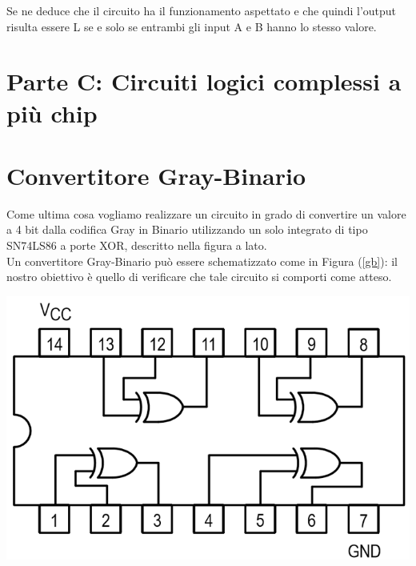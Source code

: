 \documentclass[10pt, a4paper, italian]{article}
\begin{document}
Se ne deduce che il circuito ha il funzionamento aspettato e che quindi l'output risulta essere L se e solo se entrambi gli input A e B hanno lo stesso valore.

\setcounter{section}{5}
\section*{Parte C: Circuiti logici complessi a più chip}
\section{Convertitore Gray-Binario}
\begin{minipage}{0.7\textwidth}
    Come ultima cosa vogliamo realizzare un circuito in grado di convertire un valore a 4 bit dalla codifica Gray in Binario utilizzando un solo integrato di tipo SN74LS86 a porte XOR, descritto nella figura a lato.\\
    Un convertitore Gray-Binario può essere schematizzato come in Figura (\ref{gb}): il nostro obiettivo è quello di verificare che tale circuito si comporti come atteso.
\end{minipage}
\begin{minipage}{0.3\textwidth}
    \includegraphics[width=\textwidth]{XOR.png}
\end{minipage}
\newline
\end{document}
